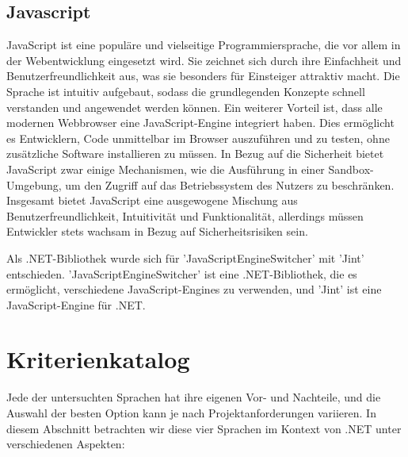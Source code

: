\cite{csharpScriptingArcticel}

\newpage 
\subsection{Javascript}
JavaScript ist eine populäre und vielseitige Programmiersprache, die vor allem in der Webentwicklung eingesetzt wird. 
Sie zeichnet sich durch ihre Einfachheit und Benutzerfreundlichkeit aus, was sie besonders für Einsteiger attraktiv macht. 
Die Sprache ist intuitiv aufgebaut, sodass die grundlegenden Konzepte schnell verstanden und angewendet werden können. 
Ein weiterer Vorteil ist, dass alle modernen Webbrowser eine JavaScript-Engine integriert haben. 
Dies ermöglicht es Entwicklern, Code unmittelbar im Browser auszuführen und zu testen, ohne zusätzliche Software installieren zu müssen. 
In Bezug auf die Sicherheit bietet JavaScript zwar einige Mechanismen, wie die Ausführung in einer Sandbox-Umgebung, um den Zugriff auf das Betriebssystem des Nutzers zu beschränken.  
Insgesamt bietet JavaScript eine ausgewogene Mischung aus Benutzerfreundlichkeit, Intuitivität und Funktionalität, allerdings müssen Entwickler stets wachsam in Bezug auf Sicherheitsrisiken sein.

Als .NET-Bibliothek wurde sich für 'JavaScriptEngineSwitcher' mit 'Jint' entschieden.
'JavaScriptEngineSwitcher' ist eine .NET-Bibliothek, die es ermöglicht, verschiedene JavaScript-Engines zu verwenden, und 'Jint' ist eine JavaScript-Engine für .NET.


\cite{mDNWebDocs} \cite{owasp}

\newpage
\section{Kriterienkatalog}
Jede der untersuchten Sprachen hat ihre eigenen Vor- und Nachteile, und die Auswahl der besten Option kann je nach Projektanforderungen variieren. 
In diesem Abschnitt betrachten wir diese vier Sprachen im Kontext von .NET unter verschiedenen Aspekten:

